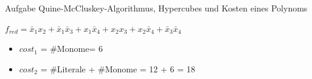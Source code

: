 \begin{frame}[allowframebreaks]{Aufgabe \thesection}{Quine-McCluskey-Algorithmus, Hypercubes und Kosten eines Polynoms}
    \begin{solutionnoinc}
        \scriptsize $f_{red} = \bar x_1x_2 +  \bar x_1 \bar x_3 + x_1 \bar x_4 + x_2x_3 + x_2 \bar x_4 +  \bar x_3 \bar x_4$
        \begin{itemize}
            \item $cost_1$ = \#Monome= 6
            \item $cost_2$ = \#Literale + \#Monome = 12 + 6 = 18
        \end{itemize}
    \end{solutionnoinc}
\end{frame}
